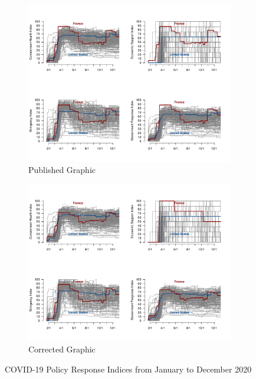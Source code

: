 \documentclass[12pt,letterpaper]{article}
\begin{document}
\begin{enumerate}
\begin{itemize}
			\begin{figure}[htp]
				\centering
				\begin{subfigure}[b]{0.8\textwidth}
					\centering
					\includegraphics[width=\textwidth]{figure1.pdf}
					\caption{Published Graphic}
					\label{fig:figure1}
				\end{subfigure}
				\hspace{0.05\textwidth} %
				\begin{subfigure}[b]{0.8\textwidth}
					\centering
					\includegraphics[width=\textwidth]{figure1_corrected.pdf}
					\caption{Corrected Graphic}
					\label{fig:figure1_corrected}
				\end{subfigure}
				\caption{COVID-19 Policy Response Indices from January to December 2020}
				\label{fig:figure1_both}
			\end{figure}
			

\end{itemize}
\end{enumerate}
\end{document}
